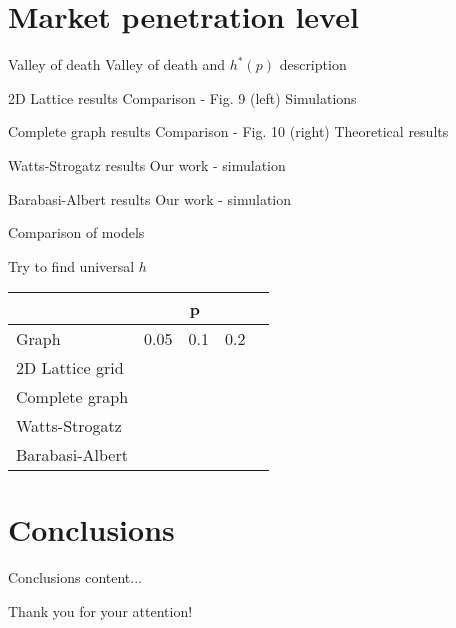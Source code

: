 \documentclass[10pt]{beamer}
\begin{document}
\section{Market penetration level}

\begin{frame}{Valley of death}
	Valley of death and $h^*(p)$ description
\end{frame}

\begin{frame}{2D Lattice results}
	Comparison - Fig. 9 (left)
	Simulations
\end{frame}

\begin{frame}{Complete graph results}
	Comparison - Fig. 10 (right)
	Theoretical results
\end{frame}

\begin{frame}{Watts-Strogatz results}
	Our work - simulation
\end{frame}

\begin{frame}{Barabasi-Albert results}
	Our work - simulation
\end{frame}

\begin{frame}{Comparison of models}
	
	Try to find universal $h$
	\begin{table}[]
		\begin{tabular}{l|llll}
			& \multicolumn{3}{c}{p} &  \\
			\hline
			Graph           & 0.05   & 0.1   & 0.2  &  \\
			\hline
			2D Lattice grid &        &       &      &  \\
			Complete graph  &        &       &      &  \\
			Watts-Strogatz  &        &       &      &  \\
			Barabasi-Albert &        &       &      & 
		\end{tabular}
	\end{table}
\end{frame}

\section{Conclusions}

\begin{frame}{Conclusions}
	content...
\end{frame}

\begin{frame}
	 \centering
	{\Large Thank you for your attention!}
	
\end{frame}
\end{document}
